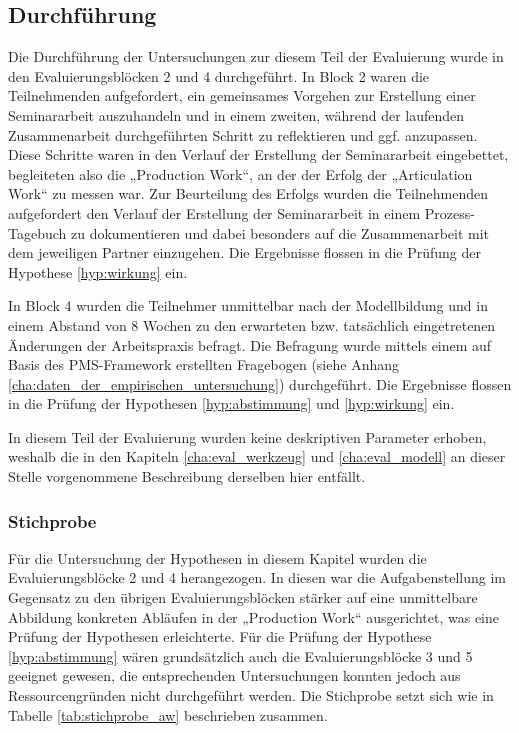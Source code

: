 
\subsection{Durchführung} %
\label{sub:a_durchführung}

Die Durchführung der Untersuchungen zur diesem Teil der Evaluierung wurde in den Evaluierungsblöcken 2 und 4 durchgeführt. In Block 2 waren die Teilnehmenden aufgefordert, ein gemeinsames Vorgehen zur Erstellung einer Seminararbeit auszuhandeln und in einem zweiten, während der laufenden Zusammenarbeit durchgeführten Schritt zu reflektieren und ggf. anzupassen. Diese Schritte waren in den Verlauf der Erstellung der Seminararbeit eingebettet, begleiteten also die „Production Work“, an der der Erfolg der „Articulation Work“ zu messen war. Zur Beurteilung des Erfolgs wurden die Teilnehmenden aufgefordert den Verlauf der Erstellung der Seminararbeit in einem Prozess-Tagebuch zu dokumentieren und dabei besonders auf die Zusammenarbeit mit dem jeweiligen Partner einzugehen. Die Ergebnisse flossen in die Prüfung der Hypothese \ref{hyp:wirkung} ein.

In Block 4 wurden die Teilnehmer unmittelbar nach der Modellbildung und in einem Abstand von 8 Wochen zu den erwarteten bzw. tatsächlich eingetretenen Änderungen der Arbeitspraxis befragt. Die Befragung wurde mittels einem auf Basis des \gls{PMS}-Framework erstellten Fragebogen (siehe Anhang \ref{cha:daten_der_empirischen_untersuchung}) durchgeführt. Die Ergebnisse flossen in die Prüfung der Hypothesen \ref{hyp:abstimmung} und \ref{hyp:wirkung} ein.

In diesem Teil der Evaluierung wurden keine deskriptiven Parameter erhoben, weshalb die in den Kapiteln \ref{cha:eval_werkzeug} und \ref{cha:eval_modell} an dieser Stelle vorgenommene Beschreibung derselben hier entfällt.

\subsubsection{Stichprobe} %

Für die Untersuchung der Hypothesen in diesem Kapitel wurden die Evaluierungsblöcke 2 und 4 herangezogen.  In diesen war die Aufgabenstellung im Gegensatz zu den übrigen Evaluierungsblöcken stärker auf eine unmittelbare Abbildung konkreten Abläufen in der „Production Work“ ausgerichtet, was eine Prüfung der Hypothesen erleichterte. Für die Prüfung der Hypothese \ref{hyp:abstimmung} wären grundsätzlich auch die Evaluierungsblöcke 3 und 5 geeignet gewesen, die entsprechenden Untersuchungen konnten jedoch aus Ressourcengründen nicht durchgeführt werden. Die Stichprobe setzt sich wie in Tabelle \ref{tab:stichprobe_aw} beschrieben zusammen.

